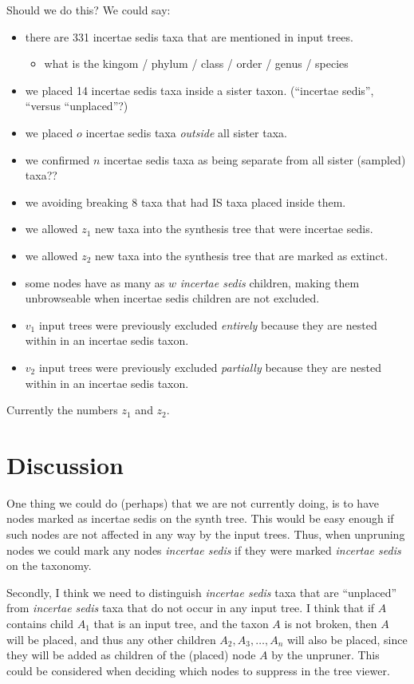 \documentclass[english]{article}
\begin{document}
Should we do this? We could say:  \begin{itemize} \item there are 331
incertae sedis taxa that are mentioned in input trees.
\begin{itemize}
\item what is the kingom / phylum / class / order / genus / species
\end{itemize} \item we placed 14 incertae sedis taxa inside a sister
taxon.
(``incertae sedis'', ``versus ``unplaced''?) \item we placed
$o$ incertae sedis taxa \emph{outside} all sister taxa.
\item we
confirmed $n$ incertae sedis taxa as being separate from all sister
(sampled) taxa?? \item we avoiding breaking 8 taxa that had IS taxa
placed inside them.
\item we allowed $z_{1}$ new taxa into the
synthesis tree that were incertae sedis.
\item we allowed $z_{2}$ new
taxa into the synthesis tree that are marked as extinct.
\item some
nodes have as many as $w$\emph{ incertae sedis} children, making them
unbrowseable when incertae sedis children are not excluded.
\item
$v_{1}$ input trees were previously excluded \emph{entirely} because
they are nested within in an incertae sedis taxon.
\item $v_{2}$ input
trees were previously excluded \emph{partially} because they are
nested within in an incertae sedis taxon.
\end{itemize} Currently the
numbers $z_{1}$ and $z_{2}$.

\section{Discussion}

One thing we could do (perhaps) that we are not currently doing, is to
have nodes marked as incertae sedis on the synth tree.
This would be
easy enough if such nodes are not affected in any way by the input
trees.
Thus, when unpruning nodes we could mark any nodes
\emph{incertae sedis} if they were marked \emph{incertae sedis} on the
taxonomy.

Secondly, I think we need to distinguish \emph{incertae sedis} taxa
that are ``unplaced'' from \emph{incertae sedis} taxa that do not
occur in any input tree.
I think that if $A$ contains child $A_{1}$
that is an input tree, and the taxon $A$ is not broken, then $A$ will
be placed, and thus any other children $A_{2},A_{3},\ldots,A_{n}$ will
also be placed, since they will be added as children of the (placed)
node $A$ by the unpruner.
This could be considered when deciding which
nodes to suppress in the tree viewer.
\end{document}
